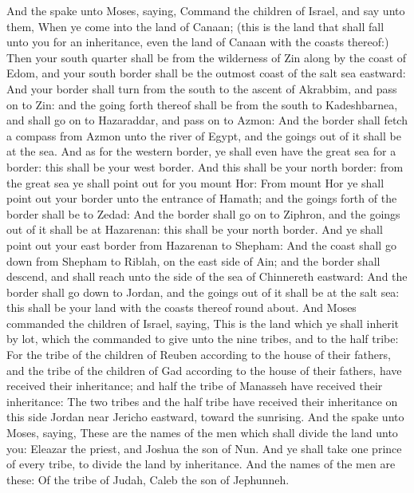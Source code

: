 \begin{biblechapter} %
\verse And the \LORD spake unto Moses, saying,
\verse Command the children of Israel, and say unto them, When ye come into the land of Canaan; (this is the land that shall fall unto you for an inheritance, even the land of Canaan with the coasts thereof:)
\verse Then your south quarter shall be from the wilderness of Zin along by the coast of Edom, and your south border shall be the outmost coast of the salt sea eastward:
\verse And your border shall turn from the south to the ascent of Akrabbim, and pass on to Zin: and the going forth thereof shall be from the south to Kadeshbarnea, and shall go on to Hazaraddar, and pass on to Azmon:
\verse And the border shall fetch a compass from Azmon unto the river of Egypt, and the goings out of it shall be at the sea.
\verse And as for the western border, ye shall even have the great sea for a border: this shall be your west border.
\verse And this shall be your north border: from the great sea ye shall point out for you mount Hor:
\verse From mount Hor ye shall point out your border unto the entrance of Hamath; and the goings forth of the border shall be to Zedad:
\verse And the border shall go on to Ziphron, and the goings out of it shall be at Hazarenan: this shall be your north border.
\verse And ye shall point out your east border from Hazarenan to Shepham:
\verse And the coast shall go down from Shepham to Riblah, on the east side of Ain; and the border shall descend, and shall reach unto the side of the sea of Chinnereth eastward:
\verse And the border shall go down to Jordan, and the goings out of it shall be at the salt sea: this shall be your land with the coasts thereof round about.
\verse And Moses commanded the children of Israel, saying, This is the land which ye shall inherit by lot, which the \LORD commanded to give unto the nine tribes, and to the half tribe:
\verse For the tribe of the children of Reuben according to the house of their fathers, and the tribe of the children of Gad according to the house of their fathers, have received their inheritance; and half the tribe of Manasseh have received their inheritance:
\verse The two tribes and the half tribe have received their inheritance on this side Jordan near Jericho eastward, toward the sunrising.
\verse And the \LORD spake unto Moses, saying,
\verse These are the names of the men which shall divide the land unto you: Eleazar the priest, and Joshua the son of Nun.
\verse And ye shall take one prince of every tribe, to divide the land by inheritance.
\verse And the names of the men are these: Of the tribe of Judah, Caleb the son of Jephunneh.

\end{biblechapter}
